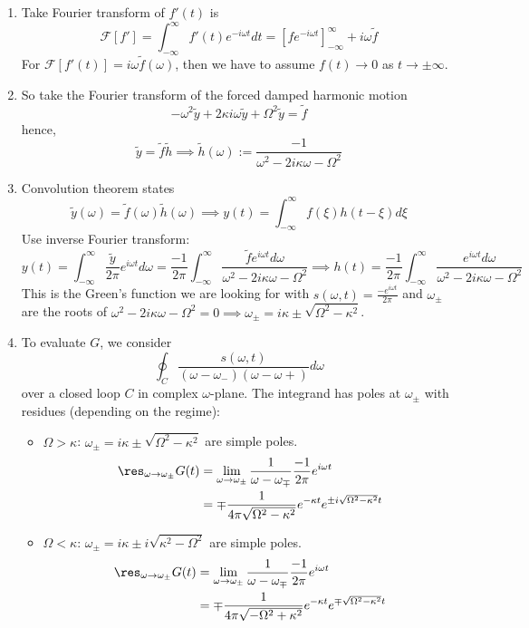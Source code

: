 \documentclass[a4paper]{article}
\begin{document}
\begin{ans}\leavevmode
\begin{enumerate}[label=(\alph*)]
\item Take Fourier transform of $f'(t)$ is
$$\mathcal{F}[f']=\int_{-\infty}^\infty f'(t)e^{-i\omega t}dt=[fe^{-i\omega t}]_{-\infty}^\infty +i\omega\tilde{f}$$
For $\mathcal{F}[f'(t)]=i\omega\tilde{f}(\omega)$, then we have to assume $f(t)\rightarrow 0$ as $t\rightarrow\pm\infty$.
\item So take the Fourier transform of the forced damped harmonic motion
$$-\omega^2\tilde{y}+2\kappa i\omega\tilde{y}+\Omega^2\tilde{y}=\tilde{f}$$
hence,
$$\tilde{y}=\tilde{f}\tilde{h}\implies\tilde{h}(\omega):=\frac{-1}{\omega^2-2i\kappa\omega-\Omega^2}$$
\item Convolution theorem states $$\tilde{y}(\omega)=\tilde{f}(\omega)\tilde{h}(\omega)\implies y(t)=\int_{-\infty}^\infty f(\xi)h(t-\xi)d\xi$$
Use inverse Fourier transform:
$$y(t)=\int_{-\infty}^\infty\frac{\tilde{y}}{2\pi}e^{i\omega t}d\omega=\frac{-1}{2\pi}\int_{-\infty}^\infty\frac{\tilde{f}e^{i\omega t}d\omega}{\omega^2-2i\kappa\omega-\Omega^2}\implies h(t)=\frac{-1}{2\pi}\int_{-\infty}^\infty\frac{e^{i\omega t}d\omega}{\omega^2-2i\kappa\omega-\Omega^2}$$
This is the Green's function we are looking for with $s(\omega,t)=\frac{-e^{i\omega t}}{2\pi}$ and $\omega_\pm$ are the roots of $\omega^2-2i\kappa\omega-\Omega^2=0\implies\omega_\pm=i\kappa\pm\sqrt{\Omega^2-\kappa^2}$.
\item To evaluate $G$, we consider
$$\oint_C\frac{s(\omega,t)}{(\omega-\omega_-)(\omega-\omega+)}d\omega$$
over a closed loop $C$ in complex $\omega$-plane. The integrand has poles at $\omega_\pm$ with residues (depending on the regime):
\begin{itemize}
    \item $\Omega>\kappa$: $\omega_\pm=i\kappa\pm \sqrt{\Omega^2-\kappa^2}$ are simple poles.
    \begin{align}
        \res_{\omega\rightarrow\omega_\pm}G(t)&=\lim_{\omega\rightarrow\omega_\pm}\frac{1}{\omega-\omega_\mp}\frac{-1}{2\pi}e^{i\omega t}\nonumber\\&=\mp\frac{1}{4\pi\sqrt{\Omega^2-\kappa^2}}e^{-\kappa t}e^{\pm i\sqrt{\Omega^2-\kappa^2}t}\nonumber
    \end{align}
    \item $\Omega<\kappa$: $\omega_\pm=i\kappa\pm i\sqrt{\kappa^2-\Omega^2}$ are simple poles.
    \begin{align}
        \res_{\omega\rightarrow\omega_\pm}G(t)&=\lim_{\omega\rightarrow\omega_\pm}\frac{1}{\omega-\omega_\mp}\frac{-1}{2\pi}e^{i\omega t}\nonumber\\&=\mp\frac{1}{4\pi\sqrt{-\Omega^2+\kappa^2}}e^{-\kappa t}e^{\mp \sqrt{\Omega^2-\kappa^2}t}\nonumber

\end{align}
\end{itemize}
\end{enumerate}
\end{ans}
\end{document}
